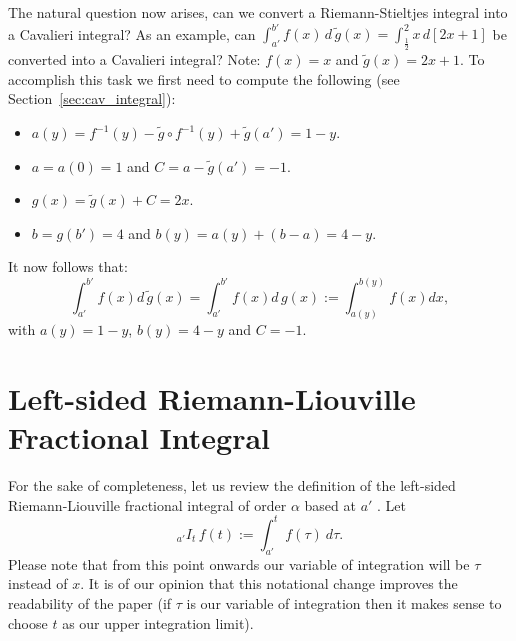 \documentclass[twoside,reqno,11pt]{fcaa-var} %
\begin{document}

\noindent
The natural question now arises, can we convert a Riemann-Stieltjes integral into a Cavalieri integral? As an example, can $\int_{a'}^{b'} f(x)\,d\,\widetilde{g}(x) = \int_{\frac{1}{2}}^2 x\,d[2x+1]$ be converted into a Cavalieri integral? Note: $f(x) = x$ and $\widetilde{g}(x) = 2x+1$. 
To accomplish this task we first need to compute the following (see Section~\ref{sec:cav_integral}):
\begin{itemize}
 \item $a(y) = f^{-1}(y) - \widetilde{g}\circ f^{-1}(y)+ \widetilde{g}(a') = 1-y$.
 \item $a = a(0) = 1$ and $C = a - \widetilde{g}(a') = -1$.
 \item $g(x) = \widetilde{g}(x) + C = 2x$.
 \item $b = g(b') = 4$ and $b(y) = a(y) + (b-a) = 4-y$.
\end{itemize}
It now follows that:
\begin{equation}
\int_{a'}^{b'} f(x)d\,\widetilde{g}(x) = \int_{a'}^{b'} f(x)d\,g(x) := \int_{a(y)}^{b(y)} f(x)dx, 
\end{equation}
with $a(y) = 1-y$, $b(y) = 4-y$ and $C=-1$.

\section{Left-sided Riemann-Liouville Fractional Integral}
\label{sec:ls}
\noindent
For the sake of completeness, let us review the definition of the left-sided Riemann-Liouville fractional integral of order $\alpha$ based at $a'$ \cite{laurent1884}. Let
\begin{equation}
_{a'}I_t\, f(t) := \int_{a'}^t f(\tau)~d\tau.
\end{equation}
Please note that from this point onwards our variable of integration will be $\tau$ instead of $x$. It is of our opinion that this notational change improves the readability of the paper (if $\tau$ is our variable of integration then it makes sense to choose $t$ as our upper integration limit).\\
\end{document}
